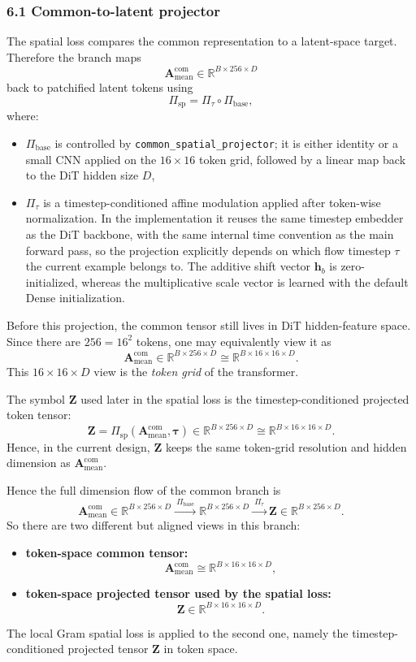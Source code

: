 \documentclass[11pt]{article}
\begin{document}
\subsubsection*{6.1 Common-to-latent projector}
The spatial loss compares the common representation to a latent-space target. Therefore the branch maps
\[
  \bm{A}^{\mathrm{com}}_{\mathrm{mean}}
  \in \mathbb{R}^{B\times 256\times D}
\]
back to patchified latent tokens using
\[
  \Pi_{\mathrm{sp}}
  =
  \Pi_{\tau}
  \circ
  \Pi_{\mathrm{base}},
\]
where:
\begin{itemize}
  \item $\Pi_{\mathrm{base}}$ is controlled by \texttt{common\_spatial\_projector}; it is either identity or a small CNN applied on the $16\times 16$ token grid, followed by a linear map back to the DiT hidden size $D$,
  \item $\Pi_{\tau}$ is a timestep-conditioned affine modulation applied after token-wise normalization. In the implementation it reuses the same timestep embedder as the DiT backbone, with the same internal time convention as the main forward pass, so the projection explicitly depends on which flow timestep $\tau$ the current example belongs to. The additive shift vector $\bm{h}_b$ is zero-initialized, whereas the multiplicative scale vector is learned with the default Dense initialization.
\end{itemize}
Before this projection, the common tensor still lives in DiT hidden-feature space. Since there are $256=16^2$ tokens, one may equivalently view it as
\[
  \bm{A}^{\mathrm{com}}_{\mathrm{mean}}
  \in \mathbb{R}^{B\times 256\times D}
  \cong
  \mathbb{R}^{B\times 16\times 16\times D}.
\]
This $16\times 16\times D$ view is the \emph{token grid} of the transformer.

The symbol $\bm{Z}$ used later in the spatial loss is the timestep-conditioned projected token tensor:
\[
  \bm{Z}
  =
  \Pi_{\mathrm{sp}}\!\left(\bm{A}^{\mathrm{com}}_{\mathrm{mean}}, \bm{\tau}\right)
  \in \mathbb{R}^{B\times 256\times D}
  \cong
  \mathbb{R}^{B\times 16\times 16\times D}.
\]
Hence, in the current design, $\bm{Z}$ keeps the same token-grid resolution and hidden dimension as $\bm{A}^{\mathrm{com}}_{\mathrm{mean}}$.

Hence the full dimension flow of the common branch is
\[
  \bm{A}^{\mathrm{com}}_{\mathrm{mean}}
  \in \mathbb{R}^{B\times 256\times D}
  \xrightarrow{\ \Pi_{\mathrm{base}}\ }
  \mathbb{R}^{B\times 256\times D}
  \xrightarrow{\ \Pi_{\tau}\ }
  \bm{Z}
  \in \mathbb{R}^{B\times 256\times D}.
\]
So there are two different but aligned views in this branch:
\begin{itemize}
  \item \textbf{token-space common tensor:}
  \[
    \bm{A}^{\mathrm{com}}_{\mathrm{mean}}
    \cong
    \mathbb{R}^{B\times 16\times 16\times D},
  \]
  \item \textbf{token-space projected tensor used by the spatial loss:}
  \[
    \bm{Z}
    \in
    \mathbb{R}^{B\times 16\times 16\times D}.
  \]
\end{itemize}
The local Gram spatial loss is applied to the second one, namely the timestep-conditioned projected tensor $\bm{Z}$ in token space.
\end{document}
